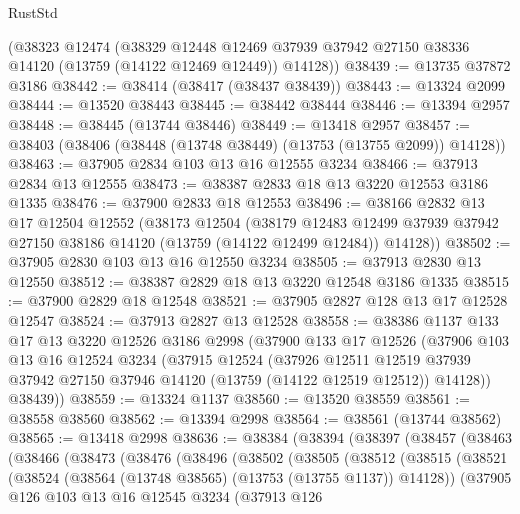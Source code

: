 \begin{lexlean}{RustStd}
\begin{coremodule}
    (@38323
      @12474
      (@38329
        @12448
        @12469
        @37939
        @37942
        @27150
        @38336
        @14120
        (@13759 (@14122 @12469 @12449))
        @14128))
@38439 := @13735 @37872 @3186
@38442 := @38414 (@38417 (@38437 @38439))
@38443 := @13324 @2099
@38444 := @13520 @38443
@38445 := @38442 @38444
@38446 := @13394 @2957
@38448 := @38445 (@13744 @38446)
@38449 := @13418 @2957
@38457 := @38403 (@38406 (@38448 (@13748 @38449) (@13753 (@13755 @2099)) @14128))
@38463 := @37905 @2834 @103 @13 @16 @12555 @3234
@38466 := @37913 @2834 @13 @12555
@38473 := @38387 @2833 @18 @13 @3220 @12553 @3186 @1335
@38476 := @37900 @2833 @18 @12553
@38496 := @38166
    @2832
    @13
    @17
    @12504
    @12552
    (@38173
      @12504
      (@38179
        @12483
        @12499
        @37939
        @37942
        @27150
        @38186
        @14120
        (@13759 (@14122 @12499 @12484))
        @14128))
@38502 := @37905 @2830 @103 @13 @16 @12550 @3234
@38505 := @37913 @2830 @13 @12550
@38512 := @38387 @2829 @18 @13 @3220 @12548 @3186 @1335
@38515 := @37900 @2829 @18 @12548
@38521 := @37905 @2827 @128 @13 @17 @12528 @12547
@38524 := @37913 @2827 @13 @12528
@38558 := @38386
    @1137
    @133
    @17
    @13
    @3220
    @12526
    @3186
    @2998
    (@37900
      @133
      @17
      @12526
      (@37906
        @103
        @13
        @16
        @12524
        @3234
        (@37915
          @12524
          (@37926
            @12511
            @12519
            @37939
            @37942
            @27150
            @37946
            @14120
            (@13759 (@14122 @12519 @12512))
            @14128))
        @38439))
@38559 := @13324 @1137
@38560 := @13520 @38559
@38561 := @38558 @38560
@38562 := @13394 @2998
@38564 := @38561 (@13744 @38562)
@38565 := @13418 @2998
@38636 := @38384
    (@38394
      (@38397
        (@38457
          (@38463
            (@38466
              (@38473
                (@38476
                  (@38496
                    (@38502
                      (@38505
                        (@38512
                          (@38515
                            (@38521
                              (@38524 (@38564 (@13748 @38565) (@13753 (@13755 @1137)) @14128))
                              (@37905
                                @126
                                @103
                                @13
                                @16
                                @12545
                                @3234
                                (@37913
                                  @126

\end{coremodule}
\end{lexlean}
